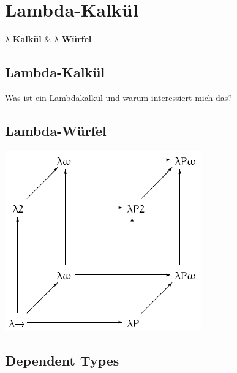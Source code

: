 \documentclass{beamer}
\begin{document}
\section*{Lambda-Kalkül}

\begin{frame}

\begin{center}
\Large $\lambda$-\textbf{Kalkül} \& $\lambda$-\textbf{Würfel} \normalsize
\end{center}

\end{frame}

\subsection*{Lambda-Kalkül}

\begin{frame}
Was ist ein Lambdakalkül und warum interessiert mich das?
\end{frame}

\subsection*{Lambda-Würfel}

\begin{frame}
\includegraphics[scale=0.5]{Lambda_cube.png} 
\end{frame}


\subsection*{Dependent Types}
\end{document}
